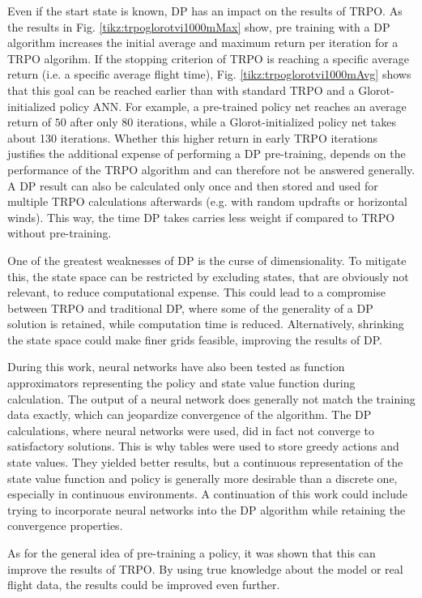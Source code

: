 Even if the start state is known, DP has an impact on the results of TRPO. As the results in Fig. \ref{tikz:trpoglorotvi1000mMax} show, pre training with a DP algorithm increases the initial average and maximum return per iteration for a TRPO algorihm. If the stopping criterion of TRPO is reaching a specific average return (i.e. a specific average flight time), Fig. \ref{tikz:trpoglorotvi1000mAvg} shows that this goal can be reached earlier than with standard TRPO and a Glorot-initialized policy ANN. For example, a pre-trained policy net reaches an average return of $50$ after only 80 iterations, while a Glorot-initialized policy net takes about 130 iterations. Whether this higher return in early TRPO iterations justifies the additional expense of performing a DP pre-training, depends on the performance of the TRPO algorithm and can therefore not be answered generally. A DP result can also be calculated only once and then stored and used for multiple TRPO calculations afterwards (e.g. with random updrafts or horizontal winds). This way, the time DP takes carries less weight if compared to TRPO without pre-training.

One of the greatest weaknesses of DP is the curse of dimensionality. To mitigate this, the state space can be restricted by excluding states, that are obviously not relevant, to reduce computational expense. This could lead to a compromise between TRPO and traditional DP, where some of the generality of a DP solution is retained, while computation time is reduced. Alternatively, shrinking the state space could make finer grids feasible, improving the results of DP.

During this work, neural networks have also been tested as function approximators representing the policy and state value function during calculation. The output of a neural network does generally not match the training data exactly, which can jeopardize convergence of the algorithm. The DP calculations, where neural networks were used, did in fact not converge to satisfactory solutions. This is why tables were used to store greedy actions and state values. They yielded better results, but a continuous representation of the state value function and policy is generally more desirable than a discrete one, especially in continuous environments. A continuation of this work could include trying to incorporate neural networks into the DP algorithm while retaining the convergence properties.

As for the general idea of pre-training a policy, it was shown that this can improve the results of TRPO. By using true knowledge about the model or real flight data, the results could be improved even further.
